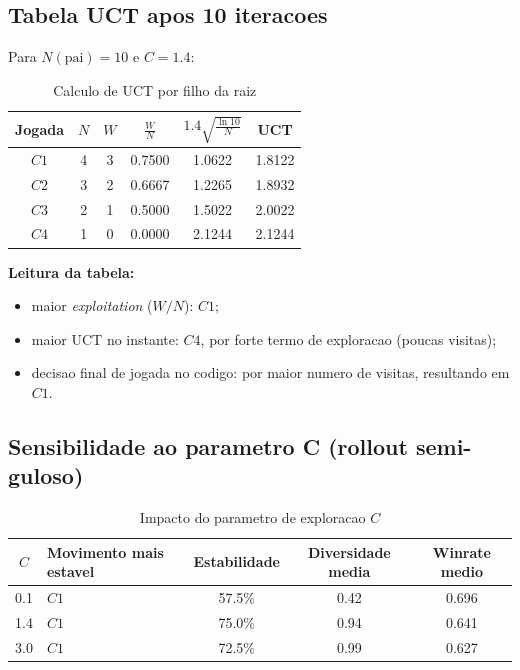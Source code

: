 \subsection{Tabela UCT apos 10 iteracoes}
Para $N(\text{pai})=10$ e $C=1.4$:
\begingroup
\small
\begin{table}[H]
\centering
\begin{tabular}{c c c c c c}
\toprule
Jogada & $N$ & $W$ & $\frac{W}{N}$ & $1.4\sqrt{\frac{\ln 10}{N}}$ & UCT \\
\midrule
$C1$ & 4 & 3 & 0.7500 & 1.0622 & 1.8122 \\
$C2$ & 3 & 2 & 0.6667 & 1.2265 & 1.8932 \\
$C3$ & 2 & 1 & 0.5000 & 1.5022 & 2.0022 \\
$C4$ & 1 & 0 & 0.0000 & 2.1244 & 2.1244 \\
\bottomrule
\end{tabular}
\caption{Calculo de UCT por filho da raiz}
\end{table}
\endgroup

\textbf{Leitura da tabela:}
\begin{itemize}[leftmargin=1.5em]
  \item maior \textit{exploitation} (\(W/N\)): $C1$;
  \item maior UCT no instante: $C4$, por forte termo de exploracao (poucas visitas);
  \item decisao final de jogada no codigo: por maior numero de visitas, resultando em \textbf{$C1$}.
\end{itemize}

\subsection{Sensibilidade ao parametro C (rollout semi-guloso)}
\begingroup
\footnotesize
\setlength{\tabcolsep}{4pt}
\begin{table}[H]
\centering
\begin{tabular}{c p{2.8cm} c c c}
\toprule
$C$ & Movimento mais estavel & Estabilidade & Diversidade media & Winrate medio \\
\midrule
0.1 & $C1$ & 57.5\% & 0.42 & 0.696 \\
1.4 & $C1$ & 75.0\% & 0.94 & 0.641 \\
3.0 & $C1$ & 72.5\% & 0.99 & 0.627 \\
\bottomrule
\end{tabular}
\caption{Impacto do parametro de exploracao $C$}
\end{table}
\endgroup

